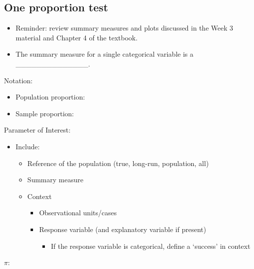 \documentclass[
]{report}
\providecommand{\tightlist}{%
  \setlength{\itemsep}{0pt}\setlength{\parskip}{0pt}}
\begin{document}

\hypertarget{one-proportion-test}{%
\subsection*{One proportion test}\label{one-proportion-test}}

\begin{itemize}
\item
  Reminder: review summary measures and plots discussed in the Week 3 material and Chapter 4 of the textbook.
\item
  The summary measure for a single categorical variable is a \_\_\_\_\_\_\_\_\_\_\_\_\_\_.
\end{itemize}

Notation:

\begin{itemize}
\item
  Population proportion:
\item
  Sample proportion:
\end{itemize}

Parameter of Interest:

\begin{itemize}
\item
  Include:

  \begin{itemize}
  \item
    Reference of the population (true, long-run, population, all)
  \item
    Summary measure
  \item
    Context

    \begin{itemize}
    \item
      Observational units/cases
    \item
      Response variable (and explanatory variable if present)

      \begin{itemize}
      \tightlist
      \item
        If the response variable is categorical, define a `success' in context
      \end{itemize}
    \end{itemize}
  \end{itemize}
\end{itemize}

\(\pi:\)

\vspace{0.4in}
\end{document}
